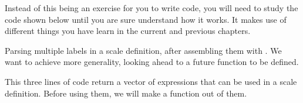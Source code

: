\documentclass[krantz2]{krantz}\usepackage{knitr}%
\begin{document}
\begin{advplayground}
Instead of this being an exercise for you to write code, you will need to study the code shown below until you are sure understand how it works. It makes use of different things you have learn in the current and previous chapters.

Parsing multiple labels in a scale definition, after assembling them with . We want to achieve more generality, looking ahead to a future function to be defined.

\begin{knitrout}\footnotesize
{}\color{fgcolor}\begin{kframe}
\begin{alltt}
 \hlkwb{<-} \hlstd{(}\hlstr{"alpha["}\hlstd{,} \hlstd{(}\hlstd{(}\hlstd{,}\hlstd{,}\hlstd{)),} \hlstr{"]"}\hlstd{)}
 \hlkwb{<-} \hlstd{(}\hlstd{,} \hlstd{) \{}\hlstd{(} 
 \hlkwb{<-} 
\end{alltt}
\end{kframe}
\end{knitrout}

This three lines of code return a vector of expressions that can be used in a scale definition. Before using them, we will make a function out of them.

\begin{knitrout}\footnotesize
{}\color{fgcolor}\begin{kframe}
\begin{alltt}
 \hlkwb{<-} \hlstd{(} \hlstd{=} \hlstd{,}  \hlstd{=} \hlopt{:}\hlstd{,} \hlstd{) \{}
    \hlstd{(} \hlstd{=}  \hlstr{"["}\hlstd{,}  \hlstr{"]"}\hlstd{,}  \hlstd{=} \hlstd{),}
            \hlstd{=} \hlstd{(}\hlstd{,} \hlstd{) \{}\hlstd{(} 
            \hlstd{=} \hlstd{)}
\hlstd{\}}
\end{alltt}
\end{kframe}
\end{knitrout}


\end{advplayground}
\end{document}
